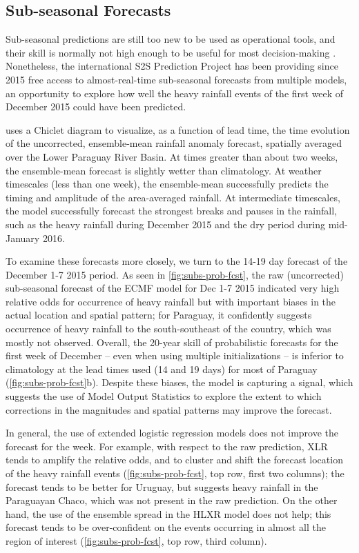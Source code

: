 \documentclass[twocol]{ametsoc}
\begin{document}
\subsection{Sub-seasonal Forecasts}

Sub-seasonal predictions are still too new to be used as operational tools, and their skill is normally not high enough to be useful for most decision-making \citep{Vigaud:2017gg}.
Nonetheless, the international S2S Prediction Project \citep{Vitart2016} has been providing since 2015 free access to almost-real-time sub-seasonal forecasts from multiple models, an opportunity to explore how well the heavy rainfall events of the first week of December 2015 could have been predicted.

 uses a Chiclet diagram \citep{Carbin:2016fx} to visualize, as a function of lead time, the time evolution of the uncorrected, ensemble-mean rainfall anomaly forecast, spatially averaged over the Lower Paraguay River Basin.
At times greater than about two weeks, the ensemble-mean forecast is slightly wetter than climatology.
At weather timescales (less than one week), the ensemble-mean successfully predicts the timing and amplitude of the area-averaged rainfall.
At intermediate timescales, the model successfully forecast the strongest breaks and pauses in the rainfall, such as the heavy rainfall during December 2015 and the dry period during mid-January 2016.

To examine these forecasts more closely, we turn to the 14-19 day forecast of the December 1-7 2015 period.
As seen in \cref{fig:subs-prob-fcst}, the raw (uncorrected) sub-seasonal forecast of the ECMF model for Dec 1-7 2015 indicated very high relative odds for occurrence of heavy rainfall but with important biases in the actual location and spatial pattern; for Paraguay, it confidently suggests occurrence of heavy rainfall to the south-southeast of the country, which was mostly not observed.
Overall, the 20-year skill of probabilistic forecasts for the first week of December -- even when using  multiple initializations -- is inferior to climatology at the lead times used (14 and 19 days) for most of Paraguay (\cref{fig:subs-prob-fcst}b).
Despite these biases, the model is capturing a signal, which suggests the use of Model Output Statistics to explore the extent to which corrections in the magnitudes and spatial patterns may improve the forecast.

In general, the use of extended logistic regression models does not improve the forecast for the week.
For example, with respect to the raw prediction, XLR tends to amplify the relative odds, and to cluster and shift the forecast location of the heavy rainfall events (\cref{fig:subs-prob-fcst}, top row, first two columns); the forecast tends to be better for Uruguay, but suggests heavy rainfall in the Paraguayan Chaco, which was not present in the raw prediction.
On the other hand, the use of the ensemble spread in the HLXR model does not help; this forecast tends to be over-confident on the events occurring in almost all the region of interest (\cref{fig:subs-prob-fcst}, top row, third column).
\end{document}
